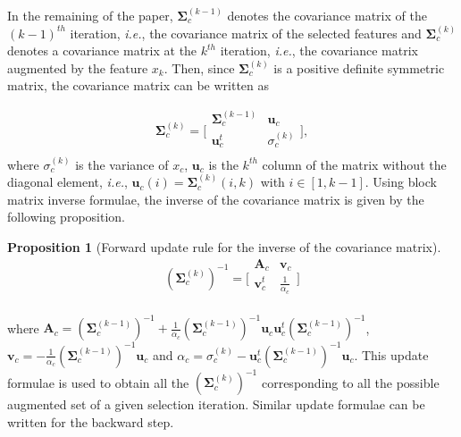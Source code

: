 \documentclass[journal,10pt]{IEEEtran}
\newtheorem{prop}{Proposition}
\begin{document}
        In the remaining of the paper, $\boldsymbol{\Sigma}_c^{(k-1)}$
        denotes the  covariance matrix of the  $(k-1)^{th}$ iteration,
        \emph{i.e.}, the  covariance matrix  of the  selected features
        and $\boldsymbol{\Sigma}_c^{(k)}$ denotes  a covariance matrix
        at the $k^{th}$ iteration,  \emph{i.e.}, the covariance matrix
        augmented  by  the  feature  $x_k$.  Then,  since
        $\boldsymbol{\Sigma}_c^{(k)}$ is a positive definite symmetric
        matrix, the covariance matrix can be written as

        \begin{equation}\label{eq:cov}
            \boldsymbol{\Sigma}_c^{(k)} =
            \bigg[\begin{array}{cc}
            \boldsymbol{\Sigma}^{(k-1)}_c & \mathbf{u}_c      \\
            \mathbf{u}_c^t          & \sigma^{(k)}_c \\
            \end{array}\bigg],
        \end{equation}
        where  $\sigma^{(k)}_c$  is  the variance  of  $x_c$,
        $\mathbf{u}_c$ is  the $k^{th}$  column of the  matrix without
        the          diagonal           element,          \emph{i.e.},
        $\mathbf{u}_{c}(i) =  \boldsymbol{\Sigma}^{(k)}_{c}(i,k)$ with
        $i  \in [1,k-1]$.   Using block  matrix inverse  formulae, the
        inverse of  the covariance  matrix is  given by  the following
        proposition.
        \begin{prop}[Forward update rule for the inverse of the covariance matrix]
        \label{eq:update-inv}
        \begin{equation}\label{eq:cov:inv}
                (\boldsymbol{\Sigma}_c^{(k)})^{-1} =
                \bigg[\begin{array}{cc}
                \mathbf{A}_c & \mathbf{v}_c \\
                \mathbf{v}_c^t  & \frac{1}{\alpha_c} \\
                \end{array}\bigg]
            \end{equation}
        \end{prop}
        \noindent                                                where
        $\mathbf{A}_c     =     (\boldsymbol{\Sigma}^{(k-1)}_c)^{-1}     +
        \frac{1}{\alpha_c} (\boldsymbol{\Sigma}^{(k-1)}_c)^{-1} \mathbf{u}_c
        \mathbf{u}_c^t              (\boldsymbol{\Sigma}^{(k-1)}_c)^{-1}$,
        $\mathbf{v}_c           =           -           \frac{1}{\alpha_c}
        (\boldsymbol{\Sigma}^{(k-1)}_c)^{-1}       \mathbf{u}_c$       and
        $      \alpha_c      =      \sigma^{(k)}_c      -      \mathbf{u}_c^t
        (\boldsymbol{\Sigma}^{(k-1)}_c)^{-1}  \mathbf{u}_c$.  This  update
        formulae      is     used      to      obtain     all      the
        $(\boldsymbol{\Sigma}^{(k)}_c)^{-1}$  corresponding  to all  the
        possible augmented set of a given selection iteration. Similar
        update formulae can be written for the backward step.
\end{document}
